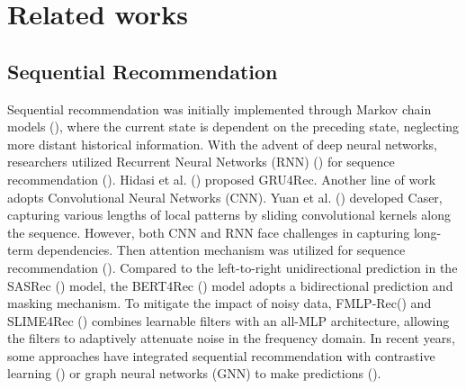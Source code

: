 \section{Related works}
\subsection{Sequential Recommendation}Sequential recommendation was initially implemented through Markov chain models (\cite{rendle2010factorizing}), where the current state is dependent on the preceding state, neglecting more distant historical information. With the advent of deep neural networks, researchers utilized Recurrent Neural Networks (RNN) (\cite{lipton2015critical}) for sequence recommendation (\cite{jing2017neural,liu2016context,beutel2018latent}). Hidasi et al. (\cite{hidasi2015session}) proposed GRU4Rec. Another line of work adopts Convolutional Neural Networks (CNN). Yuan et al. (\cite{yuan2019simple}) developed Caser, capturing various lengths of local patterns by sliding convolutional kernels along the sequence. However, both CNN and RNN face challenges in capturing long-term dependencies. Then attention mechanism was utilized for sequence recommendation (\cite{chen2018sequential,kang2018self,sun2019bert4rec}). Compared to the left-to-right unidirectional prediction in the SASRec (\cite{kang2018self}) model, the BERT4Rec (\cite{sun2019bert4rec}) model adopts a bidirectional prediction and masking mechanism. To mitigate the impact of noisy data, FMLP-Rec(\cite{zhou2022filter}) and SLIME4Rec (\cite{du2023contrastive}) combines learnable filters with an all-MLP architecture, allowing the filters to adaptively attenuate noise in the frequency domain. In recent years, some approaches have integrated sequential recommendation with contrastive learning (\cite{zhou2023equivariant,yang2023debiased,zhu2024multi,wang2024unveiling}) or graph neural networks (GNN) to make predictions (\cite{xu2019graph,zhang2022dynamic}). 


